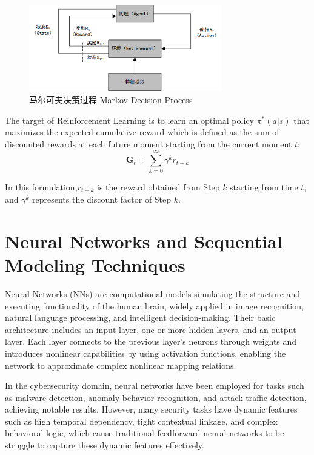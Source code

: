 \begin{figure}[hbt]
	\centering
	\includegraphics[width=0.75\textwidth]{figures/2.3}
	\caption{马尔可夫决策过程 Markov Decision Process}\label{fig:2.3}
\end{figure}

The target of Reinforcement Learning is to learn an optimal policy $\pi^{*}(a|s)$ that maximizes the expected cumulative reward which is defined as the sum of discounted rewards at each future moment starting from the current moment $t$:
\begin{equation}
	\label{eq:reward}
	\boldsymbol{G}_t = \sum_{k=0}^{\infty} \gamma^k r_{t+k}
\end{equation}

In this formulation,\( r_{t+k} \) is the reward obtained from Step \( k \) starting from time \( t \), and \( \gamma^k \) represents the discount factor of Step \( k \).

\section{Neural Networks and Sequential Modeling Techniques}

Neural Networks (NNs) are computational models simulating the structure and executing functionality of the human brain, widely applied in image recognition, natural language processing, and intelligent decision-making. Their basic architecture includes an input layer, one or more hidden layers, and an output layer. Each layer connects to the previous layer's neurons through weights and introduces nonlinear capabilities by using activation functions, enabling the network to approximate complex nonlinear mapping relations.

In the cybersecurity domain, neural networks have been employed for tasks such as malware detection, anomaly behavior recognition, and attack traffic detection, achieving notable results. However, many security tasks have dynamic features such as high temporal dependency, tight contextual linkage, and complex behavioral logic, which cause traditional feedforward neural networks to be struggle to capture these dynamic features effectively.

